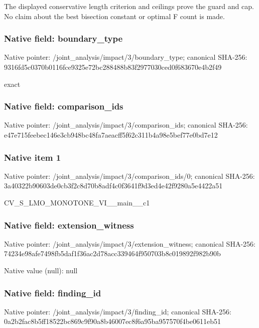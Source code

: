 \documentclass[10pt,a4paper]{article}
\begin{document}
\begingroup\raggedright\sloppy The displayed conservative length criterion and ceilings prove the guard and cap. No claim about the best bisection constant or optimal F count is made.\par\endgroup

\subsubsection{Native field: boundary\_\allowbreak{}type}
Native pointer: /joint\_\allowbreak{}analysis/impact/3/boundary\_\allowbreak{}type; canonical SHA-256: 9316fd5c0370b0116fce9325e72bc288488b83f2977030ced0f683670e4b2f49

\begingroup\raggedright\sloppy exact\par\endgroup

\subsubsection{Native field: comparison\_\allowbreak{}ids}
Native pointer: /joint\_\allowbreak{}analysis/impact/3/comparison\_\allowbreak{}ids; canonical SHA-256: e47e715feebec146e3cb948bc48fa7aeacff5f62c311b4a98e5bef77e0bd7e12

\subsubsection{Native item 1}
Native pointer: /joint\_\allowbreak{}analysis/impact/3/comparison\_\allowbreak{}ids/0; canonical SHA-256: 3a40322b90603de0cb3f2c8d70b8adf4c0f3641f9d3ed4e42f9280a5e4422a51

\begingroup\raggedright\sloppy CV\_\allowbreak{}S\_\allowbreak{}LMO\_\allowbreak{}MONOTONE\_\allowbreak{}VI\_\allowbreak{}\_\allowbreak{}main\_\allowbreak{}\_\allowbreak{}c1\par\endgroup

\subsubsection{Native field: extension\_\allowbreak{}witness}
Native pointer: /joint\_\allowbreak{}analysis/impact/3/extension\_\allowbreak{}witness; canonical SHA-256: 74234e98afe7498fb5daf1f36ac2d78acc339464f950703b8c019892f982b90b

Native value (null): null

\subsubsection{Native field: finding\_\allowbreak{}id}
Native pointer: /joint\_\allowbreak{}analysis/impact/3/finding\_\allowbreak{}id; canonical SHA-256: 0a2b2fac8b5ff18522bc869c9f90a8b46007ec8f6a95ba957570f4be0611eb51
\end{document}
